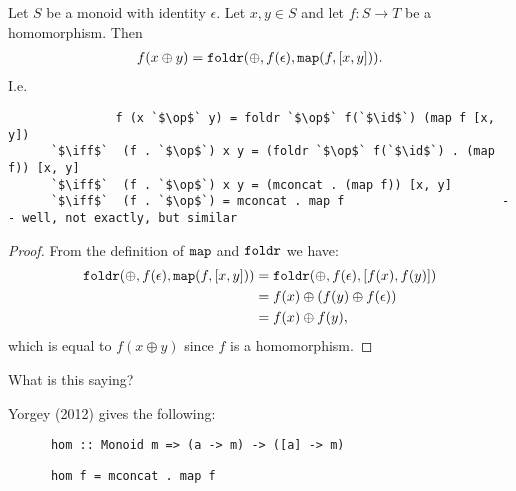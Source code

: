 \documentclass[12pt]{article}
\newcommand{\map}{\text{{\tt map}}}
\newcommand{\foldr}{\text{{\tt foldr}}}
\newcommand{\op}{\oplus}
\newcommand{\id}{\epsilon}
\begin{document}
\newpage
\begin{theorem*}
  Let $S$ be a monoid with identity $\id$. Let $x, y \in S$ and let $f:S \to T$ be a
  homomorphism. Then
  \begin{align*}
    f(x \op y) = \foldr(\op, f(\id), \map(f, [x, y])).
  \end{align*}
  I.e.
  \begin{normalfont}
    \begin{verbatim}
               f (x `$\op$` y) = foldr `$\op$` f(`$\id$`) (map f [x, y])
      `$\iff$`  (f . `$\op$`) x y = (foldr `$\op$` f(`$\id$`) . (map f)) [x, y]
      `$\iff$`  (f . `$\op$`) x y = (mconcat . (map f)) [x, y]
      `$\iff$`  (f . `$\op$`) = mconcat . map f                      -- well, not exactly, but similar
    \end{verbatim}
  \end{normalfont}
\end{theorem*}

\begin{proof}
  From the definition of $\map$ and $\foldr$ we have:
  \begin{align*}
    \foldr(\op, f(\id), \map(f, [x, y]))
    &= \foldr(\op, f(\id), [f(x), f(y)])\\
    &= f(x) \op (f(y) \op f(\id))\\
    &= f(x) \op f(y),
  \end{align*}
  which is equal to $f(x \op y)$ since $f$ is a homomorphism.
\end{proof}

\begin{remark*}
  What is this saying?


\end{remark*}

Yorgey (2012) gives the following:

\begin{definition*}\hspace{0pt}
  \begin{normalfont}
    \begin{verbatim}
      hom :: Monoid m => (a -> m) -> ([a] -> m)
    \end{verbatim}
  \end{normalfont}
\end{definition*}

\begin{theorem*}\hspace{0pt}
  \begin{normalfont}
    \begin{verbatim}
      hom f = mconcat . map f
    \end{verbatim}
  \end{normalfont}
\end{theorem*}
\end{document}

